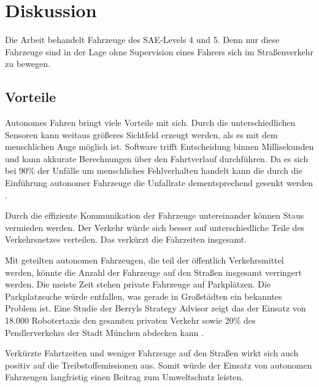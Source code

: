 \section{Diskussion}
\label{sec:diskussion}

Die Arbeit behandelt Fahrzeuge des SAE-Levels 4 und 5. Denn nur diese Fahrzeuge sind in der Lage ohne Supervision eines Fahrers sich im Straßenverkehr zu bewegen. 

\subsection{Vorteile}

Autonomes Fahren bringt viele Vorteile mit sich. Durch die unterschiedlichen Sensoren kann weitaus größeres Sichtfeld erzeugt werden, als es mit dem menschlichen Auge möglich ist. Software trifft Entscheidung binnen Millisekunden und kann akkurate Berechnungen über den Fahrtverlauf durchführen. 
Da es sich bei 90\% der Unfälle um menschliches Fehlverhalten handelt kann die durch die Einführung autonomer Fahrzeuge die Unfallrate dementsprechend gesenkt werden \cite{roadSafty}.

Durch die effiziente Kommunikation der Fahrzeuge untereinander können Staus vermieden werden. Der Verkehr würde sich besser auf unterschiedliche Teile des Verkehrsnetzes verteilen. Das verkürzt die Fahrzeiten insgesamt. 

Mit geteilten autonomen Fahrzeugen, die teil der öffentlich Verkehrsmittel werden, könnte die Anzahl der Fahrzeuge auf den Straßen insgesamt verringert werden. Die meiste Zeit stehen private Fahrzeuge auf Parkplätzen. Die Parkplatzsuche würde entfallen, was gerade in Großstädten ein bekanntes Problem ist. Eine Studie der Berryls Strategy Advisor zeigt das der Einsatz von 18.000 Robotertaxis den gesamten privaten Verkehr sowie 20\% des Pendlerverkehrs der Stadt München abdecken kann \cite{advisors2017simulation}.

Verkürzte Fahrtzeiten und weniger Fahrzeuge auf den Straßen wirkt sich auch positiv auf die Treibstoffemissionen aus. Somit würde der Einsatz von autonomen Fahrzeugen langfristig einen Beitrag zum Umweltschutz leisten.





